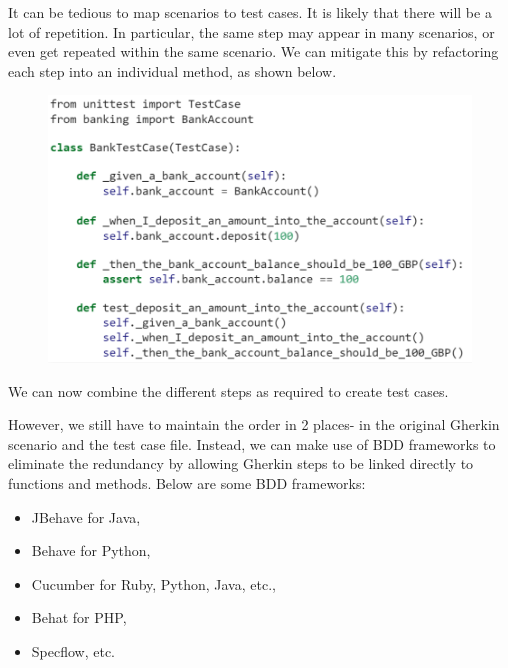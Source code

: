 \documentclass[a4paper, openany]{memoir}
\begin{document}
It can be tedious to map scenarios to test cases. It is likely that there will be a lot of repetition. In particular, the same step may appear in many scenarios, or even get repeated within the same scenario. We can mitigate this by refactoring each step into an individual method, as shown below.
\begin{figure}[H]
    \centering
    \includegraphics[scale=0.6]{src/11 BDD Python refactored test.PNG}
\end{figure}
\noindent We can now combine the different steps as required to create test cases.

However, we still have to maintain the order in 2 places- in the original Gherkin scenario and the test case file. Instead, we can make use of BDD frameworks to eliminate the redundancy by allowing Gherkin steps to be linked directly to functions and methods. Below are some BDD frameworks:
\begin{itemize}
    \item JBehave for Java,
    \item Behave for Python,
    \item Cucumber for Ruby, Python, Java, etc.,
    \item Behat for PHP,
    \item Specflow, etc.
\end{itemize}
\end{document}
